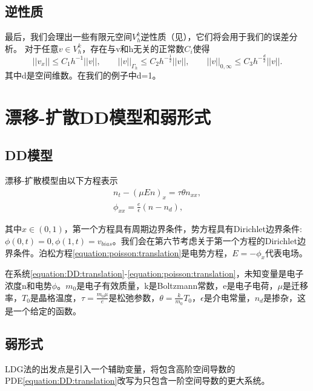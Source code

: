 \subsection{逆性质}
最后，我们会理出一些有限元空间$V_h^k$逆性质（见\parencite{ciarlet1978finite}），它们将会用于我们的误差分析。
对于任意$v \in V_h^k$，存在与v和h无关的正常数$C_i$使得
\begin{equation}
    ||v_x|| \leq C_1 h^{-1} ||v||, \qquad
    ||v||_{\Gamma_h} \leq C_2 h^{-\frac{1}{2}}||v||, \qquad
    ||v||_{0,\infty} \leq C_3 h^{-\frac{d}{2}}||v||.
\end{equation}
其中d是空间维数。在我们的例子中d=1。
\section{漂移-扩散DD模型和弱形式}
\subsection{DD模型}
漂移-扩散模型由以下方程表示
\begin{align}
    n_t - (\mu En)_x = \tau \theta n_{xx}, \label{equation:DD:translation} \\
    \phi_{xx} = \frac{e}{\epsilon}(n - n_d),  \label{equation:poisson:translation}
\end{align}

其中$x \in (0,1)$，第一个方程具有周期边界条件，势方程具有Dirichlet边界条件:$\phi(0,t) = 0, \phi(1,t) = v_{bias}$。我们会在第六节考虑关于第一个方程的Dirichlet边界条件。泊松方程\eqref{equation:poisson:translation}是电势方程，$E = -\phi_x$代表电场。

在系统\eqref{equation:DD:translation}-\eqref{equation:poisson:translation}，未知变量是电子浓度n和电势$\phi$。$m_0$是电子有效质量，k是Boltzmann常数，e是电子电荷，$\mu$是迁移率，$T_0$是晶格温度，$\tau = \frac{m_0 \mu}{e}$是松弛参数，$\theta = \frac{k}{m_0}T_0$，$\epsilon$是介电常量，$n_d$是掺杂，这是一个给定的函数。
\subsection{弱形式}
LDG法的出发点是引入一个辅助变量，将包含高阶空间导数的PDE\eqref{equation:DD:translation}改写为只包含一阶空间导数的更大系统。

